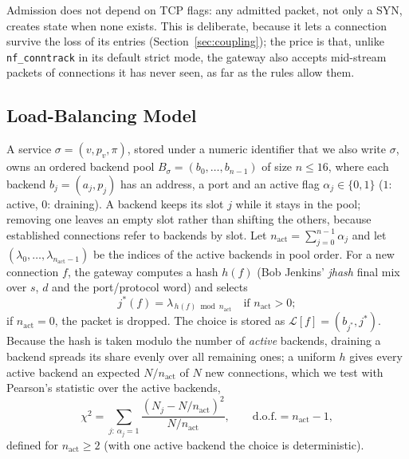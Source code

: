 \documentclass[conference]{IEEEtran}
\begin{document}
Admission does not depend on TCP flags: any admitted packet, not only a SYN,
creates state when none exists. This is deliberate, because it lets a
connection survive the loss of its entries (Section~\ref{sec:coupling}); the
price is that, unlike \texttt{nf\_conntrack} in its default strict mode, the
gateway also accepts mid-stream packets of connections it has never seen, as
far as the rules allow them.

\subsection{Load-Balancing Model}
\label{sec:lbmodel}
A service $\sigma=(v,p_v,\pi)$, stored under a numeric identifier that we
also write $\sigma$, owns an ordered backend pool
$B_\sigma=(b_0,\dots,b_{n-1})$ of size $n \le 16$, where each backend
$b_j=(a_j, p_j)$ has an address, a port and an active flag $\alpha_j\in\{0,1\}$
($1$: active, $0$: draining). A backend keeps its slot $j$ while it stays in
the pool; removing one leaves an empty slot rather than shifting the others,
because established connections refer to backends by slot.
Let $n_{\mathrm{act}} = \sum_{j=0}^{n-1}\alpha_j$ and let
$(\lambda_0,\dots,\lambda_{n_{\mathrm{act}}-1})$ be the indices of the active
backends in pool order. For a new connection $f$, the gateway computes a hash
$h(f)$ (Bob Jenkins' \textit{jhash} final mix over $s$, $d$ and the
port/protocol word) and selects
\begin{equation}
j^*(f) = \lambda_{\,h(f) \bmod n_{\mathrm{act}}}
\quad \text{if } n_{\mathrm{act}} > 0;
\label{eq:select}
\end{equation}
if $n_{\mathrm{act}} = 0$, the packet is dropped. The choice is stored as
$\mathcal{L}[f]=(b_{j^*}, j^*)$. Because the hash is taken modulo the number
of \emph{active} backends, draining a backend spreads its share evenly over
all remaining ones; a uniform $h$ gives every active backend an expected
$N/n_{\mathrm{act}}$ of $N$ new connections, which we test with Pearson's
statistic over the active backends,
\begin{equation}
\chi^2 = \sum_{j:\,\alpha_j=1} \frac{(N_j - N/n_{\mathrm{act}})^2}{N/n_{\mathrm{act}}},
\qquad \text{d.o.f.} = n_{\mathrm{act}}-1,
\label{eq:chi2}
\end{equation}
defined for $n_{\mathrm{act}} \ge 2$ (with one active backend the choice is
deterministic).
\end{document}
